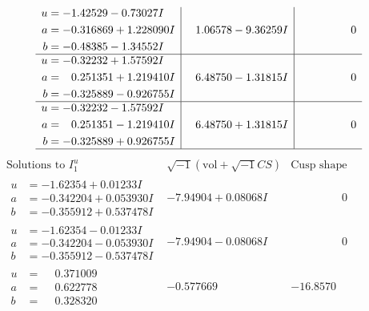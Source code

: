 \documentclass[1p]{elsarticle_modified}
\theoremstyle{definition}
\newcommand{\I}{\sqrt{-1}}
\begin{document}
$$\begin{array}{c|c|c}
\begin{aligned}
u &= -1.42529 - 0.73027 I \\
a &= -0.316869 + 1.228090 I \\
b &= -0.48385 - 1.34552 I\end{aligned}
 & \phantom{-}1.06578 - 9.36259 I & \phantom{-0.000000 } 0 \\ \hline\begin{aligned}
u &= -0.32232 + 1.57592 I \\
a &= \phantom{-}0.251351 + 1.219410 I \\
b &= -0.325889 - 0.926755 I\end{aligned}
 & \phantom{-}6.48750 - 1.31815 I & \phantom{-0.000000 } 0 \\ \hline\begin{aligned}
u &= -0.32232 - 1.57592 I \\
a &= \phantom{-}0.251351 - 1.219410 I \\
b &= -0.325889 + 0.926755 I\end{aligned}
 & \phantom{-}6.48750 + 1.31815 I & \phantom{-0.000000 } 0\\
 \hline 
 \end{array}$$\newpage$$\begin{array}{c|c|c}  
\text{Solutions to }I^u_{1}& \I (\text{vol} + \sqrt{-1}CS) & \text{Cusp shape}\\
 \hline 
\begin{aligned}
u &= -1.62354 + 0.01233 I \\
a &= -0.342204 + 0.053930 I \\
b &= -0.355912 + 0.537478 I\end{aligned}
 & -7.94904 + 0.08068 I & \phantom{-0.000000 } 0 \\ \hline\begin{aligned}
u &= -1.62354 - 0.01233 I \\
a &= -0.342204 - 0.053930 I \\
b &= -0.355912 - 0.537478 I\end{aligned}
 & -7.94904 - 0.08068 I & \phantom{-0.000000 } 0 \\ \hline\begin{aligned}
u &= \phantom{-}0.371009\phantom{ +0.000000I} \\
a &= \phantom{-}0.622778\phantom{ +0.000000I} \\
b &= \phantom{-}0.328320\phantom{ +0.000000I}\end{aligned}
 & -0.577669\phantom{ +0.000000I} & -16.8570\phantom{ +0.000000I} \\ \hline\begin{aligned}

\end{aligned}
\end{array}$$
\end{document}
